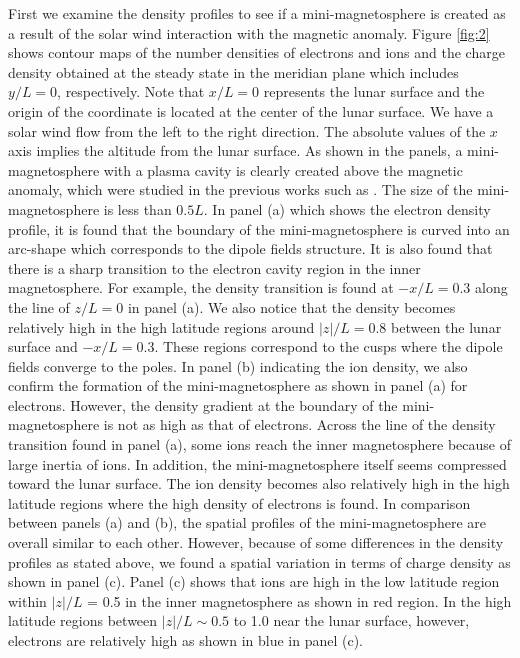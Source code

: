 \documentclass[draft,jgrga]{agutex2015}
\begin{document}
\begin{article}
First we examine the density profiles to see 
if a mini-magnetosphere is created as a result of 
the solar wind interaction with the magnetic anomaly.
Figure \ref{fig:2} shows contour maps of the number densities of electrons and ions  
and the charge density obtained at the steady state 
in the meridian plane which includes $y/L = 0$, respectively. 
Note that $x/L=0$ represents the lunar surface and 
the origin of the coordinate is located at the center of the lunar surface.
We have a solar wind flow from the left to the right direction. 
The absolute values of the $x$ axis implies the altitude from the lunar surface.
As shown in the panels, a mini-magnetosphere with a plasma cavity is clearly 
created above the magnetic anomaly, 
which were studied in the previous works such as
\citep[e.g.][]{Harnett2000,Harnett2003,Halekas2008b,Bamford2012}.
The size of the mini-magnetosphere is less than $0.5L$.
In panel (a) which shows the electron density profile, 
it is found that the boundary of the mini-magnetosphere is curved 
into an arc-shape which corresponds to the dipole fields structure.
It is also found that there is a sharp transition to 
the electron cavity region in the inner magnetosphere. 
For example, 
the density transition is found at $-x/L = 0.3$ 
along the line of $z/L =0$ in panel (a).
We also notice that the density becomes relatively high 
in the high latitude regions around
$|z|/L=0.8$ between the lunar surface and $-x/L=0.3$.
These regions correspond to the cusps where the dipole fields converge to the poles.
In panel (b) indicating the ion density, 
we also confirm the formation of the mini-magnetosphere as shown in panel (a) for electrons.
However, 
the density gradient at the boundary of the mini-magnetosphere is 
not as high as that of electrons.
Across the line of the density transition found in panel (a), 
some ions reach the inner magnetosphere because of large inertia of ions. 
In addition, the mini-magnetosphere itself seems compressed toward the lunar surface.
The ion density becomes also relatively high in the high latitude regions 
where the high density of electrons is found. 
In comparison between panels (a) and (b), 
the spatial profiles of the mini-magnetosphere are overall similar to each other. 
However, because of some differences in the density profiles as stated above, 
we found a spatial variation in terms of charge density as shown in panel (c). 
Panel (c) shows that ions are high in the low latitude region 
within $|z|/L$ = 0.5 in the inner magnetosphere as shown in red region. 
In the high latitude regions between $|z|/L \sim 0.5$ to 1.0 near the lunar surface, 
however, electrons are relatively high as shown in blue in panel (c).


\end{article}
\end{document}
